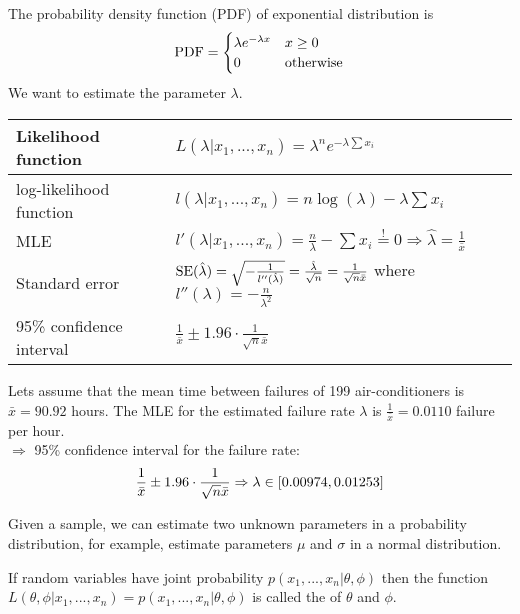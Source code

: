 \begin{example}
    The probability density function (PDF) of exponential distribution is
    \begin{align}
        \operatorname{PDF} = \begin{cases}
            \lambda e^{-\lambda x} & x\ge 0 \\ 0 & \text{otherwise}
        \end{cases}\notag
    \end{align}
    We want to estimate the parameter $\lambda$. 
    \begin{center}
       \begin{tabular}{p{4cm}|p{7cm}}
            Likelihood function & $L(\lambda\vert x_1,...,x_n) = \lambda^n e^{-\lambda\sum x_i}$ \\
            \hline
            log-likelihood function & $l(\lambda\vert x_1,...,x_n) = n\log(\lambda)-\lambda\sum x_i$ \\
            \hline
            MLE & $l'(\lambda\vert x_1,...,x_n) = \frac{n}{\lambda} - \sum x_i \overset{!}{=} 0\Rightarrow \hat{\lambda} = \frac{1}{\bar{x}}$ \\
            \hline
            Standard error & $\operatorname{SE}(\hat{\lambda}) = \sqrt{-\frac{1}{l''(\hat{\lambda})}} = \frac{\hat{\lambda}}{\sqrt{n}} = \frac{1}{\sqrt{n}\bar{x}}$ where $l''(\lambda) = -\frac{n}{\lambda^2}$ \\
            \hline
            95\% confidence interval & $\frac{1}{\bar{x}}\pm 1.96\cdot\frac{1}{\sqrt{n}\bar{x}}$
       \end{tabular}
    \end{center}
    
    Lets assume that the mean time between failures of 199 air-conditioners is $\bar{x} = 90.92$ hours. The MLE for the estimated failure rate $\lambda$ is $\frac{1}{\bar{x}} = 0.0110$ failure per hour. \\
    $\Rightarrow$ 95\% confidence interval for the failure rate:
    \begin{align}
        \frac{1}{\bar{x}} \pm 1.96\cdot\frac{1}{\sqrt{n}\bar{x}} \Rightarrow \lambda\in [0.00974,0.01253]\notag
    \end{align}
\end{example}    
    
Given a sample, we can estimate two unknown parameters in a probability distribution, for example, estimate parameters $\mu$ and $\sigma$ in a normal distribution.
    
\begin{definition}
    If random variables have joint probability $p(x_1,...,x_n\vert \theta,\phi)$ then the function $L(\theta,\phi\vert x_1,...,x_n)=p(x_1,...,x_n\vert\theta,\phi)$ is called the  of $\theta$ and $\phi$.
\end{definition}

